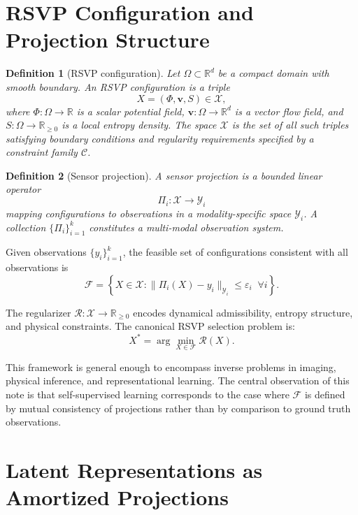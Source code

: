 \documentclass[12pt, oneside]{article}
\newtheorem{definition}{Definition}[section]
\begin{document}
\section{RSVP Configuration and Projection Structure}
\label{sec:rsvp}

\begin{definition}[RSVP configuration]
Let $\Omega \subset \mathbb{R}^d$ be a compact domain with smooth boundary. An RSVP configuration is a triple
\[
X = (\Phi, \mathbf{v}, S) \in \mathcal{X},
\]
where $\Phi : \Omega \to \mathbb{R}$ is a scalar potential field, $\mathbf{v} : \Omega \to \mathbb{R}^d$ is a vector flow field, and $S : \Omega \to \mathbb{R}_{\geq 0}$ is a local entropy density. The space $\mathcal{X}$ is the set of all such triples satisfying boundary conditions and regularity requirements specified by a constraint family $\mathcal{C}$.
\end{definition}

\begin{definition}[Sensor projection]
A sensor projection is a bounded linear operator
\[
\Pi_i : \mathcal{X} \to \mathcal{Y}_i
\]
mapping configurations to observations in a modality-specific space $\mathcal{Y}_i$. A collection $\{\Pi_i\}_{i=1}^k$ constitutes a multi-modal observation system.
\end{definition}

Given observations $\{y_i\}_{i=1}^k$, the feasible set of configurations consistent with all observations is
\[
\mathcal{F} = \left\{ X \in \mathcal{X} : \|\Pi_i(X) - y_i\|_{\mathcal{Y}_i} \leq \varepsilon_i \;\; \forall i \right\}.
\]

The regularizer $\mathcal{R} : \mathcal{X} \to \mathbb{R}_{\geq 0}$ encodes dynamical admissibility, entropy structure, and physical constraints. The canonical RSVP selection problem is:
\[
X^* = \arg\min_{X \in \mathcal{F}} \mathcal{R}(X).
\]

This framework is general enough to encompass inverse problems in imaging, physical inference, and representational learning. The central observation of this note is that self-supervised learning corresponds to the case where $\mathcal{F}$ is defined by mutual consistency of projections rather than by comparison to ground truth observations.

\section{Latent Representations as Amortized Projections}
\label{sec:latent}
\end{document}
